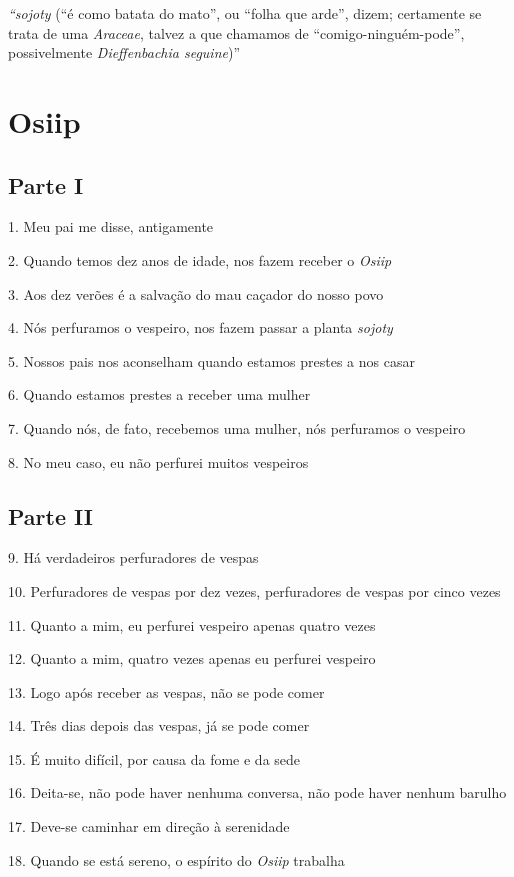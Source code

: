 \emph{``sojoty} (``é como batata do mato'', ou ``folha que arde'',
dizem; certamente se trata de uma \emph{Araceae}, talvez a que chamamos
de ``comigo-ninguém-pode'', possivelmente \emph{Dieffenbachia
seguine})''

\section{Osiip}

\subsection{Parte I}

1. Meu pai me disse, antigamente

2. Quando temos dez anos de idade, nos fazem receber o \emph{Osiip}

3. Aos dez verões é a salvação do mau caçador do nosso povo

4. Nós perfuramos o vespeiro, nos fazem passar a planta \emph{sojoty}

5. Nossos pais nos aconselham quando estamos prestes a nos casar

6. Quando estamos prestes a receber uma mulher

7. Quando nós, de fato, recebemos uma mulher, nós perfuramos o vespeiro

8. No meu caso, eu não perfurei muitos vespeiros

\subsection{Parte II}

9. Há verdadeiros perfuradores de vespas

10. Perfuradores de vespas por dez vezes, perfuradores de vespas por cinco vezes

11. Quanto a mim, eu perfurei vespeiro apenas quatro vezes

12. Quanto a mim, quatro vezes apenas eu perfurei vespeiro

13. Logo após receber as vespas, não se pode comer

14. Três dias depois das vespas, já se pode comer

15. É muito difícil, por causa da fome e da sede

16. Deita-se, não pode haver nenhuma conversa, não pode haver nenhum
barulho

17. Deve-se caminhar em direção à serenidade

18. Quando se está sereno, o espírito do \emph{Osiip} trabalha

